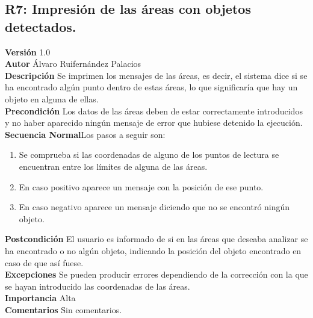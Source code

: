 \subsection{R7: Impresión de las áreas con objetos detectados.}
\textbf{Versión} 1.0\\
\textbf{Autor} Álvaro Ruifernández Palacios\\
\textbf{Descripción} Se imprimen los mensajes de las áreas, es decir, el sistema dice si se ha encontrado algún punto dentro de estas áreas, lo que significaría que hay un objeto en alguna de ellas.\\
\textbf{Precondición} Los datos de las áreas deben de estar correctamente introducidos y no haber aparecido ningún mensaje de error que hubiese detenido la ejecución.\\
\textbf{Secuencia Normal}Los pasos a seguir son:
\begin{enumerate}
	\item Se comprueba si las coordenadas de alguno de los puntos de lectura se encuentran entre los límites de alguna de las áreas.
	\item En caso positivo aparece un mensaje con la posición de ese punto.
	\item En caso negativo aparece un mensaje diciendo que no se encontró ningún objeto.
\end{enumerate}
\textbf{Postcondición} El usuario es informado de si en las áreas que deseaba analizar se ha encontrado o no algún objeto, indicando la posición del objeto encontrado en caso de que así fuese.\\
\textbf{Excepciones} Se pueden producir errores dependiendo de la corrección con la que se hayan introducido las coordenadas de las áreas.\\
\textbf{Importancia }Alta\\
\textbf{Comentarios} Sin comentarios.\\

